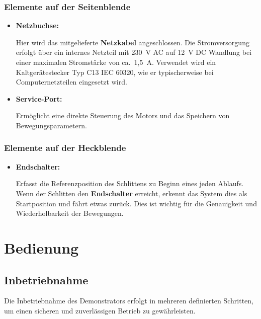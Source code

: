 \documentclass[a4paper,12pt]{report}
\begin{document}
	\subsection{Elemente auf der Seitenblende}
	\begin{itemize}[leftmargin=1.5em]
		
		\item \textbf{Netzbuchse:}
		
		Hier wird das mitgelieferte \textbf{Netzkabel} angeschlossen. Die Stromversorgung erfolgt über ein internes Netzteil mit 230~V AC auf 12~V DC Wandlung bei einer maximalen Stromstärke von ca.\ 1{,}5~A. Verwendet wird ein Kaltgerätestecker Typ C13 IEC 60320, wie er typischerweise bei Computernetzteilen eingesetzt wird.

		
		\item \textbf{Service-Port:}
		
		Ermöglicht eine direkte Steuerung des Motors und das Speichern von Bewegungsparametern.\\
		
	\end{itemize}
	
	\subsection{Elemente auf der Heckblende}
	\begin{itemize}[leftmargin=1.5em]
		
		\item \textbf{Endschalter:}
		
		Erfasst die Referenzposition des Schlittens zu Beginn eines jeden Ablaufs. Wenn der Schlitten den \textbf{Endschalter} erreicht, erkennt das System dies als Startposition und fährt etwas zurück. Dies ist wichtig für die Genauigkeit und Wiederholbarkeit der Bewegungen.\\
		
	\end{itemize}
	
	
	\chapter{Bedienung}
	\section{Inbetriebnahme}

		Die Inbetriebnahme des Demonstrators erfolgt in mehreren definierten Schritten, um einen sicheren und zuverlässigen Betrieb zu gewährleisten. \\[0,75cm]
		
\end{document}
